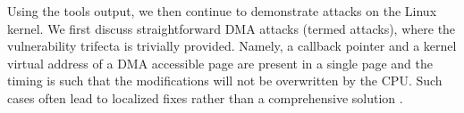 



Using the tools output, we then continue to demonstrate attacks on the Linux kernel.
%
We first discuss straightforward DMA attacks (termed \simple attacks), where the vulnerability trifecta is trivially provided. Namely, a callback pointer and a kernel virtual address of a DMA accessible page are present in a single page and the timing is such that the modifications will not be overwritten by the CPU. Such cases often lead to localized fixes rather than a comprehensive solution \cite{thunder}.

